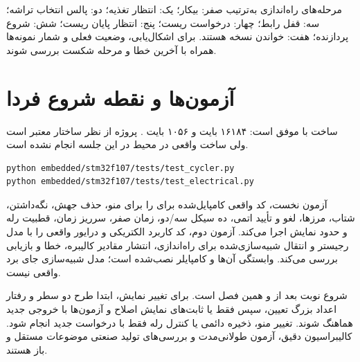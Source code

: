 مرحله‌های راه‌اندازی به‌ترتیب صفر: بیکار؛ یک: انتظار تغذیه؛ دو: پالس انتخاب تراشه؛ سه: قفل رابط؛ چهار: درخواست ریست؛ پنج: انتظار پایان ریست؛ شش: شروع پردازنده؛ هفت: خواندن نسخه هستند. برای اشکال‌یابی، وضعیت فعلی و شمار نمونه‌ها همراه با آخرین خطا و مرحله شکست بررسی شوند.

\section{آزمون‌ها و نقطه شروع فردا}
ساخت  با  موفق است: ۱۶۱۸۴ بایت  و ۱۰۵۶ بایت . پروژه  از نظر ساختار معتبر است ولی ساخت واقعی در محیط  در این جلسه انجام نشده است.

\begin{latin}
\begin{lstlisting}
python embedded/stm32f107/tests/test_cycler.py
python embedded/stm32f107/tests/test_electrical.py
\end{lstlisting}
\end{latin}

آزمون نخست، کد واقعی کامپایل‌شده برای  را برای منو، حذف جهش، نگه‌داشتن، شتاب، مرزها، لغو و تأیید اتمی، ده سیکل سه/دو، زمان صفر، سرریز زمان، قطبیت رله و حدود نمایش اجرا می‌کند. آزمون دوم، کد کاربرد الکتریکی و درایور واقعی را با مدل رجیستر و انتقال شبیه‌سازی‌شده برای راه‌اندازی، انتشار مقادیر کالیبره، خطا و بازیابی بررسی می‌کند. وابستگی آن‌ها  و کامپایلر  نصب‌شده  است؛ مدل شبیه‌سازی جای برد واقعی نیست.

شروع نوبت بعد از  و همین فصل است. برای تغییر نمایش، ابتدا طرح دو سطر و رفتار اعداد بزرگ تعیین، سپس فقط  یا ثابت‌های نمایش اصلاح و آزمون‌ها با خروجی جدید هماهنگ شوند. تغییر منو، ذخیره دائمی یا کنترل رله فقط با درخواست جدید انجام شود. کالیبراسیون دقیق، آزمون طولانی‌مدت و بررسی‌های تولید صنعتی موضوعات مستقل و باز هستند.
